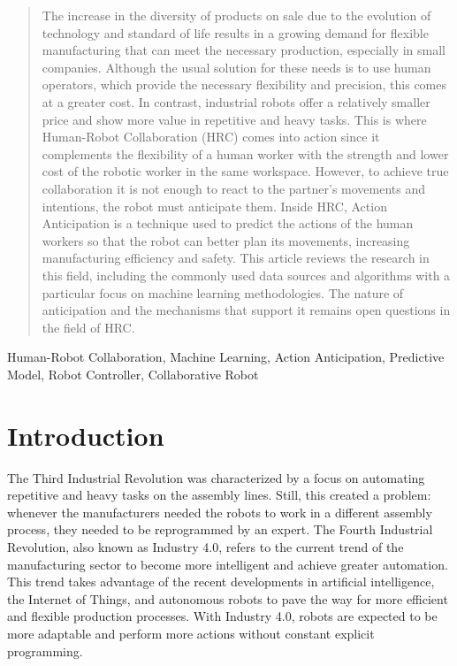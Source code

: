 \documentclass[conference]{IEEEtran}
\begin{document}
\begin{abstract}
The increase in the diversity of products on sale due to the evolution of technology and standard of life results in a growing demand for flexible manufacturing that can meet the necessary production, especially in small companies. Although the usual solution for these needs is to use human operators, which provide the necessary flexibility and precision, this comes at a greater cost. In contrast, industrial robots offer a relatively smaller price and show more value in repetitive and heavy tasks. This is where Human-Robot Collaboration (HRC) comes into action since it complements the flexibility of a human worker with the strength and lower cost of the robotic worker in the same workspace. However, to achieve true collaboration it is not enough to react to the partner's movements and intentions, the robot must anticipate them. Inside HRC, Action Anticipation is a technique used to predict the actions of the human workers so that the robot can better plan its movements, increasing manufacturing efficiency and safety. This article reviews the research in this field, including the commonly used data sources and algorithms with a particular focus on machine learning methodologies. The nature of anticipation and the mechanisms that support it remains open questions in the field of HRC.
\end{abstract}

\begin{IEEEkeywords}
Human-Robot Collaboration, Machine Learning, Action Anticipation, Predictive Model, Robot Controller, Collaborative Robot
\end{IEEEkeywords}

\section{Introduction}

The Third Industrial Revolution was characterized by a focus on automating repetitive and heavy tasks on the assembly lines. Still, this created a problem: whenever the manufacturers needed the robots to work in a different assembly process, they needed to be reprogrammed by an expert. The Fourth Industrial Revolution, also known as Industry 4.0, refers to the current trend of the manufacturing sector to become more intelligent and achieve greater automation. This trend takes advantage of the recent developments in artificial intelligence, the Internet of Things, and autonomous robots to pave the way for more efficient and flexible production processes. With Industry 4.0, robots are expected to be more adaptable and perform more actions without constant explicit programming.
\end{document}
